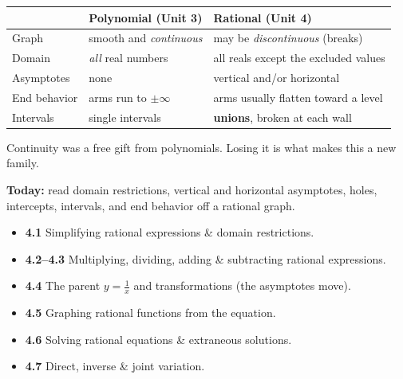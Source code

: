 \documentclass[aspectratio=169, 11pt]{beamer}
\begin{document}
\begin{frame}[t, plain]
  \begin{center}
  \renewcommand{\arraystretch}{1.5}
  \begin{tabular}{lll}
  \hline
   & \textbf{Polynomial (Unit 3)} & \textbf{Rational (Unit 4)} \\
  \hline
  Graph & smooth and \emph{continuous} & may be \emph{discontinuous} (breaks) \\
  Domain & \emph{all} real numbers & all reals except the excluded values \\
  Asymptotes & none & vertical and/or horizontal \\
  End behavior & arms run to $\pm\infty$ & arms usually flatten toward a level \\
  Intervals & single intervals & \textbf{unions}, broken at each wall \\
  \hline
  \end{tabular}
  \end{center}
  \vspace{4pt}
  \begin{center}
    Continuity was a free gift from polynomials. Losing it is what makes this a new family.
  \end{center}
\end{frame}

\begin{frame}[t, plain]
  \textbf{Today:} read domain restrictions, vertical and horizontal asymptotes, holes, intercepts,
  intervals, and end behavior off a rational graph.\\[8pt]
  \begin{itemize}\setlength{\itemsep}{3pt}
    \item \textbf{4.1} Simplifying rational expressions \& domain restrictions.
    \item \textbf{4.2--4.3} Multiplying, dividing, adding \& subtracting rational expressions.
    \item \textbf{4.4} The parent $y=\frac1x$ and transformations (the asymptotes move).
    \item \textbf{4.5} Graphing rational functions from the equation.
    \item \textbf{4.6} Solving rational equations \& extraneous solutions.
    \item \textbf{4.7} Direct, inverse \& joint variation.
  \end{itemize}
\end{frame}
\end{document}
